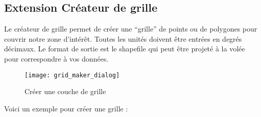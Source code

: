 \subsection{Extension Cr\'eateur de grille}


Le cr\'eateur de grille permet de cr\'eer une ``grille'' de points ou de polygones
pour couvrir notre zone d'int\'er\^et. Toutes les unit\'es doivent \^etre entr\'ees en
degr\'es d\'ecimaux. Le format de sortie est le shapefile qui peut \^etre projet\'e \`a la
vol\'ee pour correspondre \`a vos donn\'ees.

\begin{figure}[ht]
\begin{center}
  \caption{Cr\'eer une couche de grille
\nixcaption}\label{fig:graticule}\smallskip
  \texttt{[image: grid\_maker\_dialog]}
\end{center}
\end{figure}

Voici un exemple pour cr\'eer une grille :

